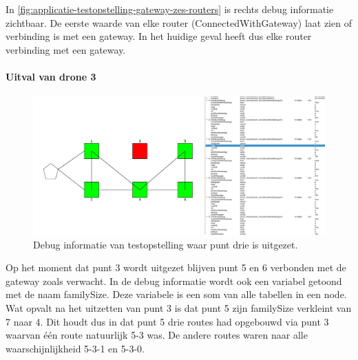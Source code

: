 \documentclass[a4paper, 11pt, oneside]{report}
\begin{document}
In \autoref{fig:applicatie-testopstelling-gateway-zes-routers} is rechts debug informatie zichtbaar.
De eerste waarde van elke router (ConnectedWithGateway) laat zien of verbinding is met een gateway.
In het huidige geval heeft dus elke router verbinding met een gateway.

\paragraph{Uitval van drone 3}

\begin{figure}[H]
	\begin{center}\includegraphics[width=\linewidth]{Afbeeldingen/testopstellingmetzes_debug_info_drie_is_uit.png}\end{center}
	\caption{Debug informatie van testopstelling waar punt drie is uitgezet.}
	\label{fig:applicatie-testopstelling-gateway-zes-routers-drie-is-uit}
\end{figure}   
Op het moment dat punt 3 wordt uitgezet blijven punt 5 en 6 verbonden met de gateway zoals verwacht.
In de debug informatie wordt ook een variabel getoond met de naam familySize. 
Deze variabele is een som van alle tabellen in een node.  
Wat opvalt na het uitzetten van punt 3 is dat punt 5 zijn familySize verkleint van 7 naar 4. 
Dit houdt dus in dat punt 5 drie routes had opgebouwd via punt 3 waarvan één route natuurlijk 5-3 was.
De andere routes waren naar alle waarschijnlijkheid 5-3-1 en 5-3-0.
\end{document}
